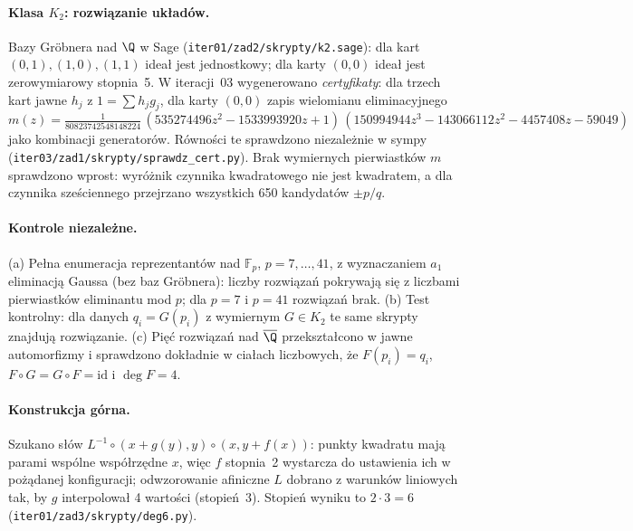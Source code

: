 \paragraph{Klasa $K_2$: rozwiązanie układów.} Bazy Gröbnera nad $\Q$ w Sage
(\texttt{iter01/zad2/skrypty/k2.sage}): dla kart $(0,1),(1,0),(1,1)$ ideał jest jednostkowy;
dla karty $(0,0)$ ideał jest zerowymiarowy stopnia~5. W iteracji~03 wygenerowano
\emph{certyfikaty}: dla trzech kart jawne $h_j$ z $1=\sum h_jg_j$, dla karty $(0,0)$ zapis
wielomianu eliminacyjnego
\[
m(z)=\tfrac{1}{80823742548148224}\,(535274496z^2-1533993920z+1)\,
(150994944z^3-143066112z^2-4457408z-59049)
\]
jako kombinacji generatorów. Równości te sprawdzono niezależnie w sympy
(\texttt{iter03/zad1/skrypty/sprawdz\_cert.py}). Brak wymiernych pierwiastków $m$
sprawdzono wprost: wyróżnik czynnika kwadratowego nie jest kwadratem, a dla czynnika
sześciennego przejrzano wszystkich 650 kandydatów $\pm p/q$.

\paragraph{Kontrole niezależne.} (a) Pełna enumeracja reprezentantów nad $\mathbb F_p$,
$p=7,\dots,41$, z wyznaczaniem $a_1$ eliminacją Gaussa (bez baz Gröbnera): liczby rozwiązań
pokrywają się z liczbami pierwiastków eliminantu mod $p$; dla $p=7$ i $p=41$ rozwiązań brak.
(b) Test kontrolny: dla danych $q_i=G(p_i)$ z wymiernym $G\in K_2$ te same skrypty znajdują
rozwiązanie. (c) Pięć rozwiązań nad $\overline{\Q}$ przekształcono w jawne automorfizmy i
sprawdzono dokładnie w ciałach liczbowych, że $F(p_i)=q_i$, $F\circ G=G\circ F=\mathrm{id}$
i $\deg F=4$.

\paragraph{Konstrukcja górna.} Szukano słów $L^{-1}\circ(x+g(y),y)\circ(x,y+f(x))$:
punkty kwadratu mają parami wspólne współrzędne $x$, więc $f$ stopnia~2 wystarcza do
ustawienia ich w pożądanej konfiguracji; odwzorowanie afiniczne $L$ dobrano z warunków
liniowych tak, by $g$ interpolował 4 wartości (stopień~3). Stopień wyniku to $2\cdot3=6$
(\texttt{iter01/zad3/skrypty/deg6.py}).
